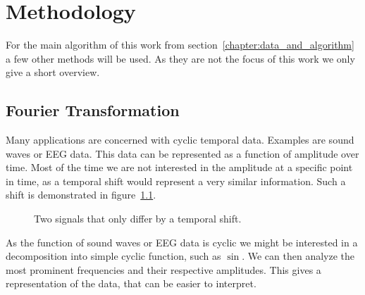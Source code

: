 \chapter{Methodology}
\label{chapter:methodology}

For the main algorithm of this work from section~\ref{chapter:data_and_algorithm} a few other methods will be used. As they are not the focus of this work we only give a short overview.

\section{Fourier Transformation}
\label{sec:fourier_transformation}

Many applications are concerned with cyclic temporal data. Examples are sound waves or EEG data. This data can be represented as a function of amplitude over time. Most of the time we are not interested in the amplitude at a specific point in time, as a temporal shift would represent a very similar information. Such a shift is demonstrated in figure~\ref{fig:tempoal_shift}.

\begin{figure}
	\centering
	
	\begin{subfigure}[b]{\textwidth}
	\end{subfigure}
	
	\caption{Two signals that only differ by a temporal shift.}
	\label{fig:tempoal_shift}
\end{figure}

As the function of sound waves or EEG data is cyclic we might be interested in a decomposition into simple cyclic function, such as $\sin$. We can then analyze the most prominent frequencies and their respective amplitudes. This gives a representation of the data, that can be easier to interpret.

